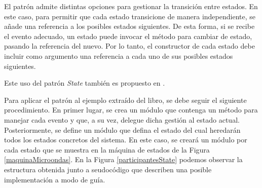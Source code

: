 El patrón admite distintas opciones para gestionar la transición entre estados. En este caso, para permitir que cada estado transicione de manera independiente, se añade una referencia a los posibles estados siguientes. De esta forma, si se recibe el evento adecuado, un estado puede invocar el método para cambiar de estado, pasando la referencia del nuevo. Por lo tanto, el constructor de cada estado debe incluir como argumento una referencia a cada uno de sus posibles estados siguientes.

Este uso del patrón \textit{State} también es propuesto en \cite[\textit{Chapter 10 : Finite State Machine Patterns Part III: New Patterns as Design Components}]{douglass}.

Para aplicar el patrón al ejemplo extraído del libro\cite{douglass}, se debe seguir el siguiente procedimiento. En primer lugar, se crea un módulo que contenga un método para manejar cada evento y que, a su vez, delegue dicha gestión al estado actual. Posteriormente, se define un módulo que defina el estado del cual heredarán todos los estados concretos del sistema. En este caso, se creará un módulo por cada estado que se muestra en la máquina de estados de la Figura \ref{maquinaMicroondas}. En la Figura \ref{participantesState} podemos observar la estructura obtenida junto a seudocódigo que describen una posible implementación a modo de guía.


